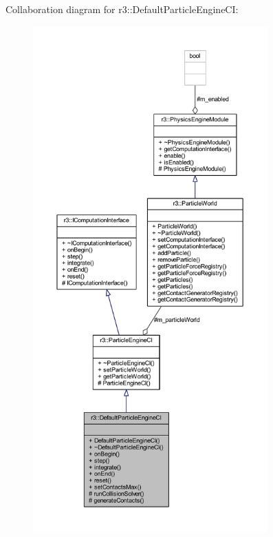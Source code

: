 Collaboration diagram for r3\+:\+:Default\+Particle\+Engine\+CI\+:\nopagebreak
\begin{figure}[H]
\begin{center}
\leavevmode
\includegraphics[height=550pt]{classr3_1_1_default_particle_engine_c_i__coll__graph}
\end{center}
\end{figure}
